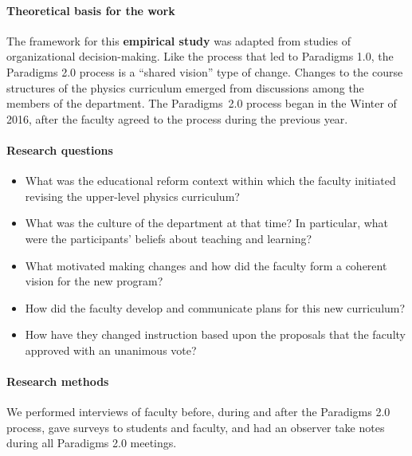 \documentclass[aps,prstper,reprint]{revtex4-1}
\begin{document}
\paragraph*{Theoretical basis for the work}
The framework for this {\bf empirical study} was adapted from studies
of organizational decision-making\cite{beach2006leadership}.  Like the
process that led to Paradigms 1.0, the Paradigms 2.0 process is a
``shared vision'' type of change\cite{henderson2010}. Changes to the
course structures of the physics curriculum emerged from discussions
among the members of the department. The Paradigms~2.0 process began
in the Winter of 2016, after the faculty agreed to the process during
the previous year.

\paragraph*{Research questions}
\begin{itemize}
\item What was the educational reform context within which the faculty
  initiated revising the upper-level physics curriculum?
\item What was the culture of the department at that time? In
  particular, what were the participants' beliefs about teaching and
  learning?
\item What motivated making changes and how did the faculty form a
  coherent vision for the new program?
\item How did the faculty develop and communicate plans for this new
  curriculum?
\item How have they changed instruction based upon the proposals that
  the faculty approved with an unanimous vote?
\end{itemize}
\paragraph*{Research methods}
We performed interviews of faculty before, during and after the
Paradigms 2.0 process, gave surveys to students and faculty, and had
an observer take notes during all Paradigms 2.0 meetings.

\end{document}
